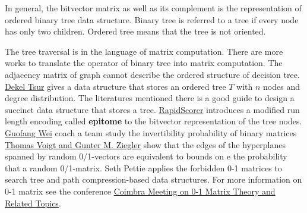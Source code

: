 \documentclass[UTF8]{article}
\begin{document}
In general, the bitvector matrix as well as its complement is the representation of ordered binary tree data structure.
Binary tree is referred to a tree if every node has only two children.
Ordered tree means that the tree is not oriented.


The tree traversal is in the language of matrix computation.
There are more works to translate the operator of binary tree into matrix computation.
The adjacency matrix of graph cannot describe the  ordered structure of decision tree.
\href{https://arxiv.org/pdf/1807.00371.pdf}{Dekel Tsur} gives a data structure
that stores an ordered tree $T$ with $n$ nodes and degree distribution.
The literatures mentioned there is a good guide
to design a succinct data structure that stores a tree.
\href{http://ai.stanford.edu/~wzou/kdd_rapidscorer.pdf}{RapidScorer}\cite{ye2018rapidscorer:}
introduces a modified run length encoding called \textbf{epitome} to the bitvector representation of the tree nodes.
\href{https://pdfs.semanticscholar.org/b85f/da059a6aa272ded62a467e5c735dd53183b5.pdf}{ Guofang Wei}
coach a team study the invertibility probability of binary matrices
\href{https://arxiv.org/abs/math/0308050}{Thomas Voigt and Gunter M. Ziegler}\cite{voigt2006singular}
show that the edges of the  hyperplanes spanned by random 0/1-vectors are equivalent to bounds on e the probability that a random 0/1-matrix.
Seth Pettie applies the forbidden 0-1 matrices to search tree
and path compression-based data structures\cite{pettie2010applications}.
For more information on 0-1 matrix
see the conference \href{http://www.mat.uc.pt/~cmf/01MatrixTheory2010/invited_speakers.html}{Coimbra Meeting on
0-1 Matrix Theory and Related Topics}.
\end{document}
